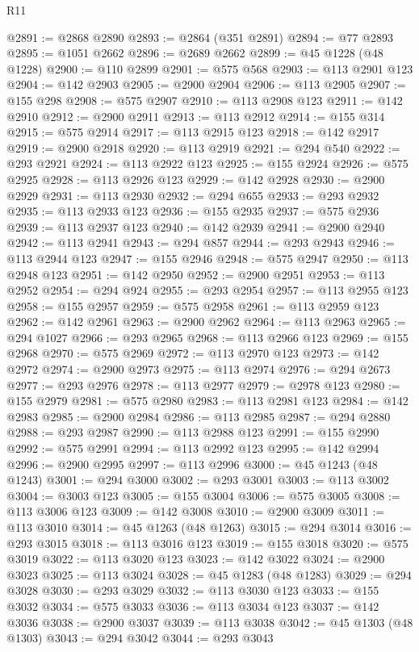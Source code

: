\begin{lexlean}{R11}
\begin{coremodule}
@2891 := @2868 @2890
@2893 := @2864 (@351 @2891)
@2894 := @77 @2893
@2895 := @1051 @2662
@2896 := @2689 @2662
@2899 := @45 @1228 (@48 @1228)
@2900 := @110 @2899
@2901 := @575 @568
@2903 := @113 @2901 @123
@2904 := @142 @2903
@2905 := @2900 @2904
@2906 := @113 @2905
@2907 := @155 @298
@2908 := @575 @2907
@2910 := @113 @2908 @123
@2911 := @142 @2910
@2912 := @2900 @2911
@2913 := @113 @2912
@2914 := @155 @314
@2915 := @575 @2914
@2917 := @113 @2915 @123
@2918 := @142 @2917
@2919 := @2900 @2918
@2920 := @113 @2919
@2921 := @294 @540
@2922 := @293 @2921
@2924 := @113 @2922 @123
@2925 := @155 @2924
@2926 := @575 @2925
@2928 := @113 @2926 @123
@2929 := @142 @2928
@2930 := @2900 @2929
@2931 := @113 @2930
@2932 := @294 @655
@2933 := @293 @2932
@2935 := @113 @2933 @123
@2936 := @155 @2935
@2937 := @575 @2936
@2939 := @113 @2937 @123
@2940 := @142 @2939
@2941 := @2900 @2940
@2942 := @113 @2941
@2943 := @294 @857
@2944 := @293 @2943
@2946 := @113 @2944 @123
@2947 := @155 @2946
@2948 := @575 @2947
@2950 := @113 @2948 @123
@2951 := @142 @2950
@2952 := @2900 @2951
@2953 := @113 @2952
@2954 := @294 @924
@2955 := @293 @2954
@2957 := @113 @2955 @123
@2958 := @155 @2957
@2959 := @575 @2958
@2961 := @113 @2959 @123
@2962 := @142 @2961
@2963 := @2900 @2962
@2964 := @113 @2963
@2965 := @294 @1027
@2966 := @293 @2965
@2968 := @113 @2966 @123
@2969 := @155 @2968
@2970 := @575 @2969
@2972 := @113 @2970 @123
@2973 := @142 @2972
@2974 := @2900 @2973
@2975 := @113 @2974
@2976 := @294 @2673
@2977 := @293 @2976
@2978 := @113 @2977
@2979 := @2978 @123
@2980 := @155 @2979
@2981 := @575 @2980
@2983 := @113 @2981 @123
@2984 := @142 @2983
@2985 := @2900 @2984
@2986 := @113 @2985
@2987 := @294 @2880
@2988 := @293 @2987
@2990 := @113 @2988 @123
@2991 := @155 @2990
@2992 := @575 @2991
@2994 := @113 @2992 @123
@2995 := @142 @2994
@2996 := @2900 @2995
@2997 := @113 @2996
@3000 := @45 @1243 (@48 @1243)
@3001 := @294 @3000
@3002 := @293 @3001
@3003 := @113 @3002
@3004 := @3003 @123
@3005 := @155 @3004
@3006 := @575 @3005
@3008 := @113 @3006 @123
@3009 := @142 @3008
@3010 := @2900 @3009
@3011 := @113 @3010
@3014 := @45 @1263 (@48 @1263)
@3015 := @294 @3014
@3016 := @293 @3015
@3018 := @113 @3016 @123
@3019 := @155 @3018
@3020 := @575 @3019
@3022 := @113 @3020 @123
@3023 := @142 @3022
@3024 := @2900 @3023
@3025 := @113 @3024
@3028 := @45 @1283 (@48 @1283)
@3029 := @294 @3028
@3030 := @293 @3029
@3032 := @113 @3030 @123
@3033 := @155 @3032
@3034 := @575 @3033
@3036 := @113 @3034 @123
@3037 := @142 @3036
@3038 := @2900 @3037
@3039 := @113 @3038
@3042 := @45 @1303 (@48 @1303)
@3043 := @294 @3042
@3044 := @293 @3043

\end{coremodule}
\end{lexlean}
